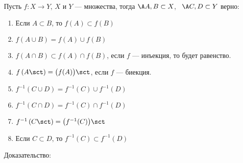 
Пусть $f \colon X \to Y$, $X$ и $Y$ --- множества, тогда $\A A, B \subset X$, \ $ \A C, D \subset Y$ верно:
\begin{enumerate}
	\item Если $A \subset B$, то $f(A) \subset f(B)$
	
	\item $f(A \cup B) = f(A) \cup f(B)$
	
	\item $f(A \cap B) \subset f(A) \cap f(B)$, если $f$ --- инъекция, то будет равенство.
	
	\item $f\left(A\sct\right) = \bigl(f(A)\bigr)\sct$, если $f$ --- биекция.
	
	\item $f^{-1}(C \cup D) = f^{-1}(C) \cup f^{-1}(D)$ 
	
	\item $f^{-1}(C \cap D) = f^{-1}(C) \cap f^{-1}(D)$
	
	\item $f^{-1}\left(C\sct\right) = \bigl(f^{-1}(C)\bigr)\sct$
	
	\item Если $C \subset D$, то $f^{-1}(C) \subset f^{-1}(D)$
\end{enumerate}
\small
Доказательство: 
